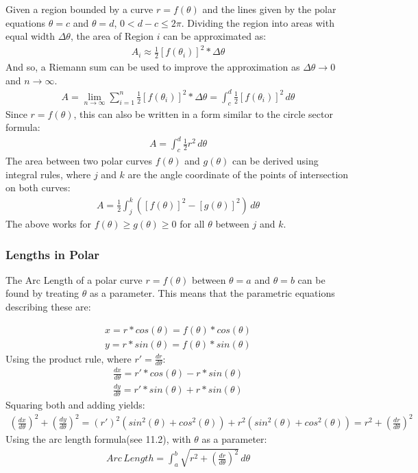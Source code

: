 \documentclass{article}
\begin{document}
Given a region bounded by a curve $r=f(\theta)$ and the lines given by the polar equations $\theta=c$ and $\theta=d$, $0 < d - c \leqslant 2\pi$. Dividing the region into areas with equal width $\Delta \theta$, the area of Region $i$ can be approximated as:
\begin{gather*}
    A_i \approx \frac{1}{2} [f(\theta_i)]^2 * \Delta \theta
\end{gather*}
And so, a Riemann sum can be used to improve the approximation as $\Delta \theta \to 0$ and $n \to \infty$.
\begin{gather*}
    A = \lim_{n \to \infty} \sum_{i=1}^{n} \frac{1}{2} [f(\theta_i)]^2 * \Delta \theta = \int_c^d \frac{1}{2} [f(\theta_i)]^2 \hspace{2pt}d\theta
\end{gather*}
Since $r=f(\theta)$, this can also be written in a form similar to the circle sector formula:
\begin{gather*}
    A = \int_c^d \frac{1}{2} r^2 \hspace{2pt}d\theta
\end{gather*}
The area between two polar curves $f(\theta)$ and $g(\theta)$ can be derived using integral rules, where $j$ and $k$ are the angle coordinate of the points of intersection on both curves:
\begin{gather*}
    A = \frac{1}{2} \int_j^k ([f(\theta)]^2 - [g(\theta)]^2) \hspace{2pt}d\theta
\end{gather*}
The above works for $f(\theta) \geqslant g(\theta) \geqslant 0$ for all $\theta$ between $j$ and $k$.
\subsubsection{Lengths in Polar}
The Arc Length of a polar curve $r=f(\theta)$ between $\theta = a$ and $\theta = b$ can be found by treating $\theta$ as a parameter. This means that the parametric equations describing these are:

\begin{gather*}
    x = r * cos(\theta) = f(\theta)*cos(\theta)
\\
    y = r * sin(\theta) = f(\theta) * sin(\theta)
\end{gather*}
Using the product rule, where $r' = \frac{dr}{d\theta}$:
\begin{gather*}
    \frac{dx}{d\theta} = r' * cos(\theta) - r * sin(\theta)
    \\
    \frac{dy}{d\theta} = r' * sin(\theta) + r * sin(\theta)
\end{gather*}
Squaring both and adding yields:
\begin{gather*}
    (\frac{dx}{d\theta})^2 + (\frac{dy}{d\theta})^2 = (r')^2(sin^2(\theta) + cos^2(\theta)) + r^2(sin^2(\theta) + cos^2(\theta)) = r^2 + (\frac{dr}{d\theta})^2
\end{gather*}
Using the arc length formula(see 11.2), with $\theta$ as a parameter:
\begin{gather*}
    Arc\hspace{2pt}Length = \int_a^b \sqrt{r^2 + (\frac{dr}{d\theta})^2} \hspace{2pt} d\theta
\end{gather*}
\end{document}
